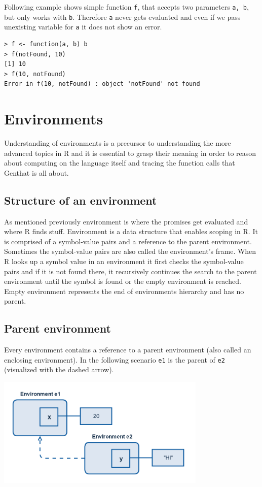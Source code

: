 \documentclass[thesis=B,english]{FITthesis}[2012/10/20]
\begin{document}
Following example shows simple function \verb|f|, that accepts two parameters \verb|a, b|, but only works with \verb|b|. Therefore \verb|a| never gets evaluated and even if we pass unexisting variable for \verb|a| it does not show an error.

\begin{verbatim}
> f <- function(a, b) b
> f(notFound, 10)
[1] 10
> f(10, notFound)
Error in f(10, notFound) : object 'notFound' not found
\end{verbatim}

\section{Environments}
Understanding of environments is a precursor to understanding the more advanced topics in R and it is essential to grasp their meaning in order to reason about computing on the language itself and tracing the function calls that Genthat is all about.

\subsection{Structure of an environment}
As mentioned previously environment is where the promises get evaluated and where R finds stuff. Environment is a data structure that enables scoping in R. It is comprised of a symbol-value pairs and a reference to the parent environment. Sometimes the symbol-value pairs are also called the environment’s frame. When R looks up a symbol value in an environment it first checks the symbol-value pairs and if it is not found there, it recursively continues the search to the parent environment until the symbol is found or the empty environment is reached. Empty environment represents the end of environments hierarchy and has no parent.

\subsection{Parent environment}
Every environment contains a reference to a parent environment (also called an enclosing environment). In the following scenario \verb|e1| is the parent of \verb|e2| (visualized with the dashed arrow).


\includegraphics[width=0.75\textwidth]{img/parent-env.png}
\end{document}
